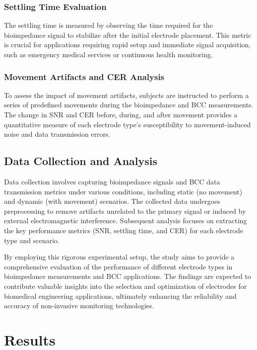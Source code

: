\documentclass[conference]{IEEEtran}
\begin{document}
\subsubsection{Settling Time Evaluation}
The settling time is measured by observing the time required for the bioimpedance signal to stabilize after the initial electrode placement. This metric is crucial for applications requiring rapid setup and immediate signal acquisition, such as emergency medical services or continuous health monitoring.

\subsubsection{Movement Artifacts and CER Analysis}
To assess the impact of movement artifacts, subjects are instructed to perform a series of predefined movements during the bioimpedance and BCC measurements. The change in SNR and CER before, during, and after movement provides a quantitative measure of each electrode type's susceptibility to movement-induced noise and data transmission errors.

\subsection{Data Collection and Analysis}

Data collection involves capturing bioimpedance signals and BCC data transmission metrics under various conditions, including static (no movement) and dynamic (with movement) scenarios. The collected data undergoes preprocessing to remove artifacts unrelated to the primary signal or induced by external electromagnetic interference. Subsequent analysis focuses on extracting the key performance metrics (SNR, settling time, and CER) for each electrode type and scenario.

By employing this rigorous experimental setup, the study aims to provide a comprehensive evaluation of the performance of different electrode types in bioimpedance measurements and BCC applications. The findings are expected to contribute valuable insights into the selection and optimization of electrodes for biomedical engineering applications, ultimately enhancing the reliability and accuracy of non-invasive monitoring technologies.



\section{Results}
\end{document}
